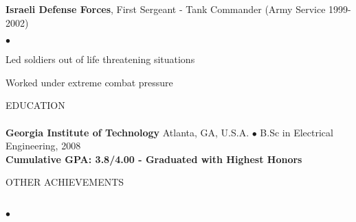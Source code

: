 \documentclass[12pt]{article}
\newcommand{\lineunder}{\vspace*{-9pt} \\ \hspace*{-18pt} \hrulefill \\}
\newcommand{\header}[1]{{\hspace*{-15pt}\vspace*{6pt} \textsc{#1}} \vspace*{-9pt} \lineunder}
\newcommand{\employer}[2]{{ #1 (#2) }}
\newenvironment{achievements}{\begin{list}{$\bullet$}{\topsep 0pt \itemsep -2pt}}{\vspace*{4pt}\end{list}}
\newcommand{\schoolwithcourses}[4]{
 \textbf{#1} #2 $\bullet$ #3\\
#4 \\
\vspace*{5pt}
}
\begin{document}
  \employer{\textbf{Israeli Defense Forces}, First Sergeant - Tank Commander}{Army Service 1999-2002}
  	\begin{achievements}
      \item Led soldiers out of life threatening situations
    	\item Worked under extreme combat pressure
  	\end{achievements}

\header{EDUCATION}
  \schoolwithcourses{Georgia Institute of Technology}{Atlanta, GA, U.S.A.}{B.Sc in Electrical Engineering, 2008}
    {\textbf{Cumulative GPA: 3.8/4.00  - Graduated with Highest Honors}}

\header{OTHER ACHIEVEMENTS}
  \begin{achievements}
    \item
    \item
    \item
    \item
    \item
  \end{achievements}
\end{document}
